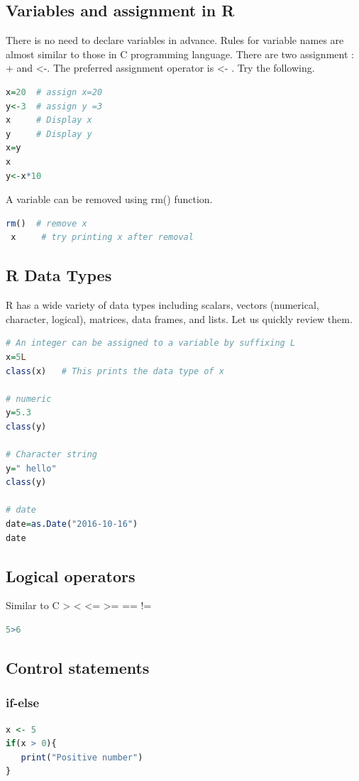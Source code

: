 \documentclass["../Applied_probabillity _and_statistics_lab_KTU.tex"]{subfiles}
\begin{document}
\subsection{Variables and assignment in R}
 There is no  need to declare variables in advance. Rules for variable names are almost similar to those in C programming language. There are two assignment : + and <-.  The preferred assignment operator is <- . 
 Try the following.
  \begin{lstlisting}[language=R]
x=20  # assign x=20
y<-3  # assign y =3
x     # Display x
y     # Display y
x=y
x
y<-x*10

\end{lstlisting}

A variable can be removed using rm() function.

 \begin{lstlisting}[language=R]
 rm()  # remove x 
 x     # try printing x after removal
\end{lstlisting}

\subsection{R Data Types}
R has a wide variety of data types including scalars, vectors (numerical, character, logical), matrices, data frames, and lists. Let us quickly review them.
\begin{lstlisting}[language=R]
# An integer can be assigned to a variable by suffixing L
x=5L
class(x)   # This prints the data type of x
 
# numeric 
y=5.3
class(y)

# Character string
y=" hello"
class(y)

# date
date=as.Date("2016-10-16")
date

\end{lstlisting}
 
 \subsection{Logical operators}
 Similar to C > < <= >= == !=
 
\begin{lstlisting}[language=R]
 5>6

\end{lstlisting}
\subsection{Control statements}
 \subsubsection*{if-else}
    \begin{lstlisting}[language=R]
 x <- 5
if(x > 0){
   print("Positive number")
}

\end{lstlisting}
\end{document}
